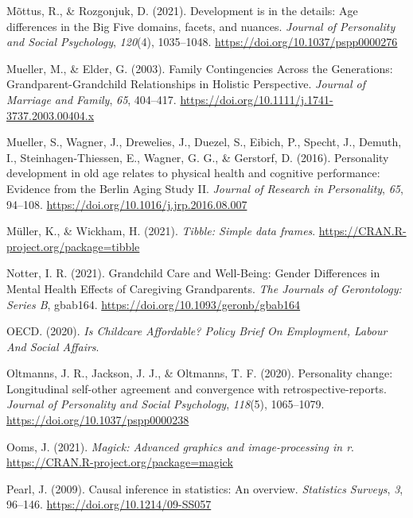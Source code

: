\documentclass[
  english,
  man,floatsintext]{apa7}
\begin{document}
\leavevmode\hypertarget{ref-mottusDevelopmentDetailsAge2021}{}%
Mõttus, R., \& Rozgonjuk, D. (2021). Development is in the details: Age differences in the Big Five domains, facets, and nuances. \emph{Journal of Personality and Social Psychology}, \emph{120}(4), 1035--1048. \url{https://doi.org/10.1037/pspp0000276}

\leavevmode\hypertarget{ref-muellerFamilyContingenciesGenerations2003}{}%
Mueller, M., \& Elder, G. (2003). Family Contingencies Across the Generations: Grandparent-Grandchild Relationships in Holistic Perspective. \emph{Journal of Marriage and Family}, \emph{65}, 404--417. \url{https://doi.org/10.1111/j.1741-3737.2003.00404.x}

\leavevmode\hypertarget{ref-muellerPersonalityDevelopmentOld2016}{}%
Mueller, S., Wagner, J., Drewelies, J., Duezel, S., Eibich, P., Specht, J., Demuth, I., Steinhagen-Thiessen, E., Wagner, G. G., \& Gerstorf, D. (2016). Personality development in old age relates to physical health and cognitive performance: Evidence from the Berlin Aging Study II. \emph{Journal of Research in Personality}, \emph{65}, 94--108. \url{https://doi.org/10.1016/j.jrp.2016.08.007}

\leavevmode\hypertarget{ref-R-tibble}{}%
Müller, K., \& Wickham, H. (2021). \emph{Tibble: Simple data frames}. \url{https://CRAN.R-project.org/package=tibble}

\leavevmode\hypertarget{ref-notterGrandchildCareWellBeing2021}{}%
Notter, I. R. (2021). Grandchild Care and Well-Being: Gender Differences in Mental Health Effects of Caregiving Grandparents. \emph{The Journals of Gerontology: Series B}, gbab164. \url{https://doi.org/10.1093/geronb/gbab164}

\leavevmode\hypertarget{ref-oecdChildcareAffordablePolicy2020}{}%
OECD. (2020). \emph{Is Childcare Affordable? Policy Brief On Employment, Labour And Social Affairs}.

\leavevmode\hypertarget{ref-oltmannsPersonalityChangeLongitudinal2020}{}%
Oltmanns, J. R., Jackson, J. J., \& Oltmanns, T. F. (2020). Personality change: Longitudinal self-other agreement and convergence with retrospective-reports. \emph{Journal of Personality and Social Psychology}, \emph{118}(5), 1065--1079. \url{https://doi.org/10.1037/pspp0000238}

\leavevmode\hypertarget{ref-R-magick}{}%
Ooms, J. (2021). \emph{Magick: Advanced graphics and image-processing in r}. \url{https://CRAN.R-project.org/package=magick}

\leavevmode\hypertarget{ref-pearlCausalInferenceStatistics2009}{}%
Pearl, J. (2009). Causal inference in statistics: An overview. \emph{Statistics Surveys}, \emph{3}, 96--146. \url{https://doi.org/10.1214/09-SS057}
\end{document}
